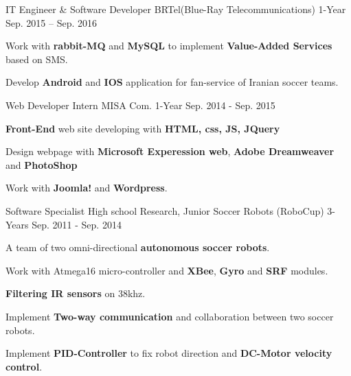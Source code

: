 \begin{cventries}
  \cventry
    {IT Engineer \& Software Developer} %
    {BRTel(Blue-Ray Telecommunications)} %
    {1-Year} %
    {Sep. 2015 -- Sep. 2016} %
    {
      \begin{cvitems} %
        \item {Work with \textbf{rabbit-MQ} and \textbf{MySQL} to implement \textbf{Value-Added Services} based on SMS.}
        \item {Develop \textbf{Android} and \textbf{IOS} application for fan-service of Iranian soccer teams.}
      \end{cvitems}
    }

  \cventry
    {Web Developer Intern} %
    {MISA Com.} %
    {1-Year} %
    {Sep. 2014 - Sep. 2015} %
    {
      \begin{cvitems} %
        \item {\textbf{Front-End} web site developing with \textbf{HTML, css, JS, JQuery}}
        \item {Design webpage with \textbf{Microsoft Experession web}, \textbf{Adobe Dreamweaver} and \textbf{PhotoShop}}
        \item {Work with \textbf{Joomla!} and \textbf{Wordpress}.}
      \end{cvitems}
    }
  \cventry
    {Software Specialist} %
    {High school Research, Junior Soccer Robots (RoboCup)} %
    {3-Years} %
    {Sep. 2011 - Sep. 2014} %
    {
      \begin{cvitems} %
        \item {A team of two omni-directional \textbf{autonomous soccer robots}.}
        \item {Work with Atmega16 micro-controller and \textbf{XBee}, \textbf{Gyro} and \textbf{SRF} modules.}
        \item {\textbf{Filtering IR sensors} on 38khz.}
        \item {Implement \textbf{Two-way communication} and collaboration between two soccer robots.}
        \item {Implement \textbf{PID-Controller} to fix robot direction and \textbf{DC-Motor velocity control}.}
      \end{cvitems}
    }


\end{cventries}

